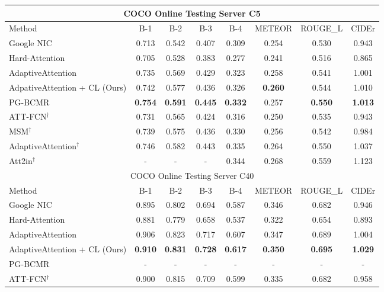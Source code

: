 \begin{table}
\centering
\small
\begin{tabular}{lccccccc}
\toprule
\multicolumn{8}{c}{COCO Online Testing Server C5} \\
\midrule
Method & B-1 & B-2 & B-3 & B-4 & METEOR & ROUGE\_L & CIDEr \\
\midrule
Google NIC \cite{vinyals2015show} & 0.713 & 0.542 & 0.407 & 0.309 & 0.254 & 0.530 & 0.943 \\
Hard-Attention\cite{xu2015show} & 0.705 & 0.528 & 0.383 & 0.277 & 0.241 & 0.516 & 0.865 \\
AdaptiveAttention \cite{lu2016knowing} & 0.735 & 0.569 & 0.429 & 0.323 & 0.258 & 0.541 & 1.001 \\ 
AdpativeAttention + CL (Ours) & 0.742 & 0.577 & 0.436 & 0.326 & \textbf{0.260} & 0.544 & 1.010 \\
PG-BCMR \cite{liu2016optimization} & \textbf{0.754} & \textbf{0.591} & \textbf{0.445} & \textbf{0.332} & 0.257 & \textbf{0.550} & \textbf{1.013} \\
\midrule
ATT-FCN$^\dagger$ \cite{you2016image} & 0.731 & 0.565 & 0.424 & 0.316 & 0.250 & 0.535 & 0.943 \\
MSM$^\dagger$ \cite{yao2016boosting} & 0.739 & 0.575 & 0.436 & 0.330 & 0.256 & 0.542 & 0.984 \\
AdaptiveAttention$^\dagger$ \cite{lu2016knowing} & 0.746 & 0.582 & 0.443 & 0.335 & 0.264 & 0.550 & 1.037 \\
Att2in$^\dagger$ \cite{rennie2016self} & - & - & - & 0.344 & 0.268 & 0.559 & 1.123 \\
\midrule
\midrule
\multicolumn{8}{c}{COCO Online Testing Server C40} \\
\midrule
Method & B-1 & B-2 & B-3 & B-4 & METEOR & ROUGE\_L & CIDEr \\
\midrule
Google NIC \cite{vinyals2015show} & 0.895 & 0.802 & 0.694 & 0.587 & 0.346 & 0.682 & 0.946 \\
Hard-Attention \cite{xu2015show} & 0.881 & 0.779 & 0.658 & 0.537 & 0.322 & 0.654 & 0.893 \\
AdaptiveAttention \cite{lu2016knowing} & 0.906 & 0.823 & 0.717 & 0.607 & 0.347 & 0.689 & 1.004 \\ 
AdaptiveAttention + CL (Ours) & \textbf{0.910} & \textbf{0.831} & \textbf{0.728} & \textbf{0.617} & \textbf{0.350} & \textbf{0.695} & \textbf{1.029} \\
PG-BCMR \cite{liu2016optimization} & - & - & - & - & - & - & - \\
\midrule
ATT-FCN$^\dagger$ \cite{you2016image} & 0.900 & 0.815 & 0.709 & 0.599 & 0.335 & 0.682 & 0.958 \\

\end{tabular}
\end{table}
